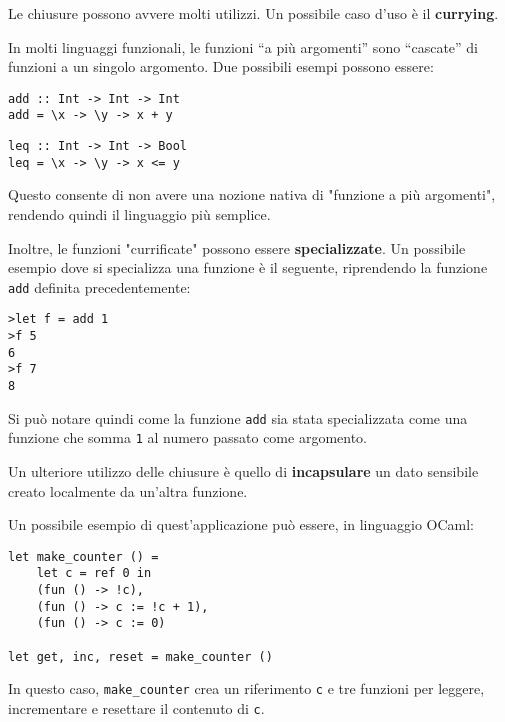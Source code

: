\documentclass{article}
\begin{document}
Le chiusure possono avvere molti utilizzi. Un possibile caso d'uso è il \textbf{currying}.

In molti linguaggi funzionali, le funzioni “a più argomenti” sono “cascate” di funzioni a un singolo argomento. Due possibili esempi possono essere:
\begin{tcolorbox}
\begin{verbatim}
add :: Int -> Int -> Int
add = \x -> \y -> x + y
\end{verbatim}
\end{tcolorbox}
\begin{tcolorbox}
\begin{verbatim}
leq :: Int -> Int -> Bool
leq = \x -> \y -> x <= y
\end{verbatim}
\end{tcolorbox}

Questo consente di non avere una nozione nativa di "funzione a più argomenti", rendendo quindi il linguaggio più semplice.

Inoltre, le funzioni "currificate" possono essere \textbf{specializzate}. Un possibile esempio dove si specializza una funzione è il seguente, riprendendo la funzione \texttt{add} definita precedentemente:
\begin{tcolorbox}
\begin{verbatim}
>let f = add 1
>f 5
6
>f 7
8
\end{verbatim}
\end{tcolorbox}
Si può notare quindi come la funzione \texttt{add} sia stata specializzata come una funzione che somma \texttt{1} al numero passato come argomento. 

\pagebreak

Un ulteriore utilizzo delle chiusure è quello di \textbf{incapsulare} un dato sensibile creato localmente da un'altra funzione.


Un possibile esempio di quest'applicazione può essere, in linguaggio OCaml:
\begin{tcolorbox}
\begin{verbatim}
let make_counter () =
    let c = ref 0 in
    (fun () -> !c),
    (fun () -> c := !c + 1),
    (fun () -> c := 0)

let get, inc, reset = make_counter ()
\end{verbatim}
\end{tcolorbox}

In questo caso, \texttt{make\_counter} crea un riferimento \texttt{c} e tre funzioni per leggere, incrementare e resettare il contenuto di \texttt{c}.
\end{document}
